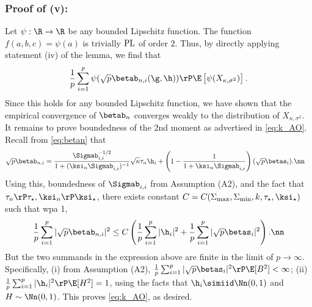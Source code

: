 \subsubsection{Proof of (v):} Let $\psi:\R\rightarrow\R$ be any bounded Lipschitz function. The function $f(a,b,c) = \psi(a)$ is trivially $\rm{PL}$ of order $2$. Thus, by directly applying statement (iv) of the lemma, we find that
$$
\frac{1}{p}\sum_{i=1}^p{\psi(\sqrt{p}\betab_{n,i}(\g,\h))} \rP \E\left[\psi(X_{\kappa,\sigma^2})\right].
$$
Since this holds for any bounded Lipschitz function, we have shown that the empirical convergence of $\betab_n$ converges weakly to the distribution of $X_{\kappa,\sigma^2}$. It remains to prove boundedness of the $2$nd moment as advertised in \eqref{eq:k_AO}. Recall  from
\eqref{eq:betan} that
\begin{align}
\sqrt{p}\betab_{n,i}&=\frac{{\Sigmab_{i,i}^{-1/2}}}{1+(\ksi_n\Sigmab_{i,i})^{-1}}\sqrt{\kappa}\tau_n\h_i +\left(1-\frac{1}{1+\ksi_n\Sigmab_{i,i}}\right)(\sqrt{p}\betas_i).\nn
\end{align}
Using this, boundedness of $\Sigmab_{i,i}$ from Assumption (A2), and the fact that $\tau_n\rP\tau_\star, \ksi_n\rP\ksi_\star$, there exists constant $C=C(\Sigma_{\max},\Sigma_{\min},k,\tau_\star,\ksi_\star)$ such that wpa 1,
\begin{align}
\frac{1}{p}\sum_{i=1}^p|\sqrt{p}\betab_{n,i}|^{2} \leq C\left(\frac{1}{p}\sum_{i=1}^p|\h_{i}|^{2}+\frac{1}{p}\sum_{i=1}^p|\sqrt{p}\betas_{i}|^{2}\right).\nn
\end{align}
But the two summands in the expression above are finite in the limit of $p\rightarrow\infty$. Specifically, (i) from Assumption (A2), $\frac{1}{p}\sum_{i=1}^p|\sqrt{p}\betas_{i}|^{2}\rP\E[B^{2}]<\infty$; (ii) $\frac{1}{p}\sum_{i=1}^p|\h_{i}|^{2}\rP\E[H^{2}]=1$, using the facts that $\h_i\simiid\Nn(0,1)$ and $H\sim\Nn(0,1)$. This proves \eqref{eq:k_AO}, as desired.

